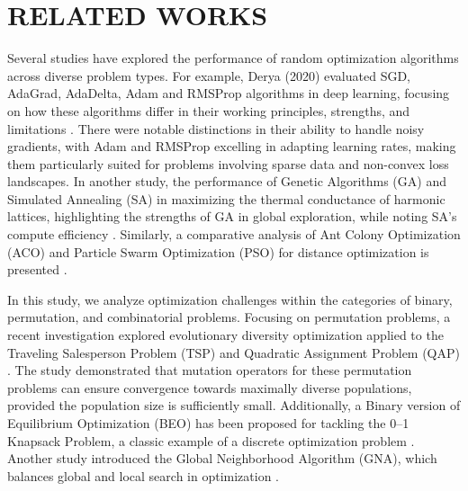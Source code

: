 \section{RELATED WORKS}
Several studies have explored the performance of random optimization algorithms across diverse problem types. For example, Derya (2020) evaluated SGD, AdaGrad, AdaDelta, Adam and RMSProp algorithms in deep learning, focusing on how these algorithms differ in their working principles, strengths, and limitations \cite{Soydaner2020}. There were notable distinctions in their ability to handle noisy gradients, with Adam and RMSProp excelling in adapting learning rates, making them particularly suited for problems involving sparse data and non-convex loss landscapes. In another study, the performance of Genetic Algorithms (GA) and Simulated Annealing (SA) in maximizing the thermal conductance of harmonic lattices, highlighting the strengths of GA in global exploration, while noting SA’s compute efficiency \cite{KERR201931}. Similarly, a comparative analysis of Ant Colony Optimization (ACO) and Particle Swarm Optimization (PSO) for distance optimization is presented \cite{GUPTA2020245}.

In this study, we analyze optimization challenges within the categories of binary, permutation, and combinatorial problems. Focusing on permutation problems, a recent investigation explored evolutionary diversity optimization applied to the Traveling Salesperson Problem (TSP) and Quadratic Assignment Problem (QAP) \cite{Do_2022}. The study demonstrated that mutation operators for these permutation problems can ensure convergence towards maximally diverse populations, provided the population size is sufficiently small. Additionally, a Binary version of Equilibrium Optimization (BEO) has been proposed for tackling the 0–1 Knapsack Problem, a classic example of a discrete optimization problem \cite{ABDELBASSET2021106946}. Another study introduced the Global Neighborhood Algorithm (GNA), which balances global and local search in optimization \cite{Alazzam2013}.
